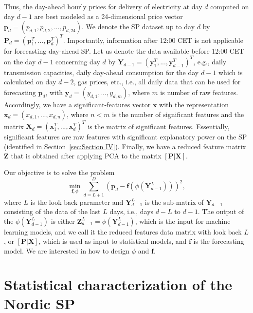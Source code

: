 \documentclass{article}
\begin{document}
Thus, the day-ahead hourly prices for delivery of electricity at day $d$ computed on day $d-1$ are best modeled as a 24-dimensional price vector $\textbf{p}_d=(p_{d,1}, p_{d,2},...,p_{d,24})$.
We denote the SP dataset up to day $d$ by $\textbf{P}_d = (\textbf{p}_1^T,...,\textbf{p}_d^T)^T$.
Importantly, information after 12:00 CET is not applicable for forecasting day-ahead SP. Let us denote the data available before 12:00 CET on the day $d-1$ concerning day $d$ by $\textbf{Y}_{d-1} = (\textbf{y}_1^T,...,\textbf{y}_{d-1}^T)^T$, e.g., daily transmission capacities, daily day-ahead consumption for the day $d-1$ which is calculated on day $d-2$, gas prices, etc., i.e., all daily data that can be used for forecasting $\textbf{p}_d$, with $\textbf{y}_d = (y_{d,1},...,y_{d,m})$, where $m$ is number of raw features. Accordingly, we have a significant-features vector $\textbf{x}$ with the representation $\textbf{x}_d = (x_{d,1},...,x_{d,n})$, where $n < m$ is the number of significant features and the matrix $\textbf{X}_d = (\textbf{x}_1^T,...,\textbf{x}_d^T)^T $ is the matrix of significant features. Essentially, significant features are raw features with significant explanatory power on the SP (identified in Section~\ref{sec:Section IV}). Finally, we have a reduced feature matrix $\textbf{Z}$ that is obtained after applying PCA to the matrix $[\textbf{P}|\textbf{X}]$.

Our objective is to solve the problem 
\begin{equation}
    \min_{\textbf{f},\phi}\sum_{d=L+1}^{D}(\textbf{p}_d-\textbf{f}(\phi(\textbf{Y}_{d-1}^L)))^2,
\end{equation}
where $L$ is the look back parameter and $\textbf{Y}_{d-1}^L$ is the sub-matrix of $\textbf{Y}_{d-1}$ consisting of the data of the last $L$ days, i.e., days $d-L$ to $d-1$. The output of the $\phi(\textbf{Y}_{d-1}^L)$ is either $\textbf{Z}_{d-1}^L=\phi(\textbf{Y}_{d-1}^L)$, which is the input for machine learning models, and we call it the reduced features data matrix with look back $L$, or $[\textbf{P}|\textbf{X}]$, which is used as input to statistical models, and $\textbf{f}$ is the forecasting model. We are interested in how to design $\phi$ and $\textbf{f}$.


\section{Statistical characterization of the Nordic SP} \label{sec:stat}
\end{document}

